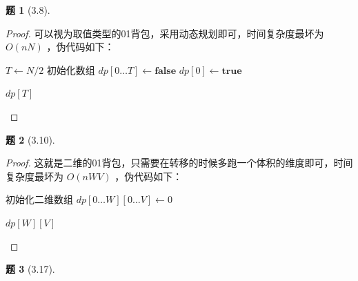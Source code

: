 \documentclass[11pt, a4paper]{article}
\newtheorem{problem}{题}
\begin{document}
\begin{problem}[3.8]
\end{problem}

\begin{proof}
    可以视为取值类型的01背包，采用动态规划即可，时间复杂度最坏为 $O(nN)$ ，伪代码如下：

    \begin{algorithm}[H]
    \caption{集合等和划分算法 (基于动态规划)}
    
    
    $T \leftarrow N / 2$\;
    初始化数组 $dp[0 \dots T] \leftarrow \textbf{false}$\;
    $dp[0] \leftarrow \textbf{true}$\;
    
    \Return $dp[T]$\;
    \end{algorithm}
\end{proof}

\begin{problem}[3.10]
\end{problem}

\begin{proof}
    这就是二维的01背包，只需要在转移的时候多跑一个体积的维度即可，时间复杂度最坏为 $O(nWV)$ ，伪代码如下：
    
    \begin{algorithm}[H]
    \caption{二维费用 0-1 背包问题}
    
    初始化二维数组 $dp[0 \dots W][0 \dots V] \leftarrow 0$\;
    
    \Return $dp[W][V]$\;
    \end{algorithm}
\end{proof}

\begin{problem}[3.17]
\end{problem}
\end{document}
